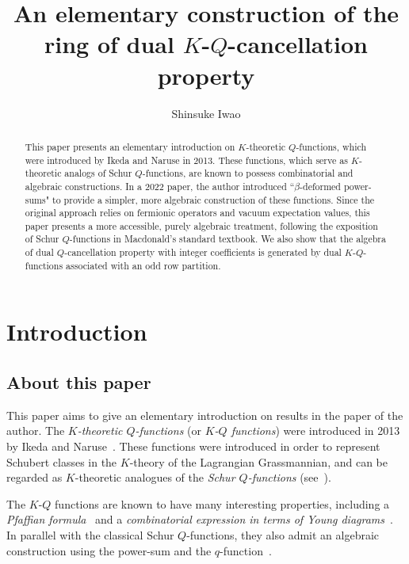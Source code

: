 \documentclass[dvipdfmx]{amsart}
\title{An elementary construction of the ring of dual $K$-$Q$-cancellation property}
\author{Shinsuke Iwao}
\theoremstyle{definition}
\theoremstyle{remark}
\begin{document}
\maketitle

\begin{abstract}      %
This paper presents an elementary introduction on $K$-theoretic $Q$-functions, which were introduced by Ikeda and Naruse in 2013. These functions, which serve as $K$-theoretic analogs of Schur $Q$-functions, are known to possess combinatorial and algebraic constructions. 
In a 2022 paper, the author introduced ``$\beta$-deformed power-sums" to provide a simpler, more algebraic construction of these functions. 
Since the original approach relies on fermionic operators and vacuum expectation values, this paper presents a more accessible, purely algebraic treatment, following the exposition of Schur $Q$-functions in Macdonald's standard textbook.
We also show that the algebra of dual $Q$-cancellation property with integer coefficients is generated by dual $K$-$Q$-functions associated with an odd row partition.
\end{abstract}

\section{Introduction}

\subsection{About this paper}

This paper aims to give an elementary introduction on results in the paper \cite{iwao2022,iwao2023} of the author.
The \emph{$K$-theoretic $Q$-functions} (or \emph{$K$-$Q$ functions}) were introduced in 2013 by Ikeda and Naruse~\cite{IKEDA201322}.  
These functions were introduced in order to represent Schubert classes in the $K$-theory of the Lagrangian Grassmannian,
and can be regarded as $K$-theoretic analogues of the \emph{Schur $Q$-functions} (see~\cite[§III-8]{macbook}).

The $K$-$Q$ functions are known to have many interesting properties, including a \emph{Pfaffian formula}~\cite{HUDSON2017115} and a \emph{combinatorial expression in terms of Young diagrams}~\cite{IKEDA201322}.  
In parallel with the classical Schur $Q$-functions, they also admit an algebraic construction using the power-sum and the $q$-function~\cite[III,\S 8]{macbook}.
\end{document}
